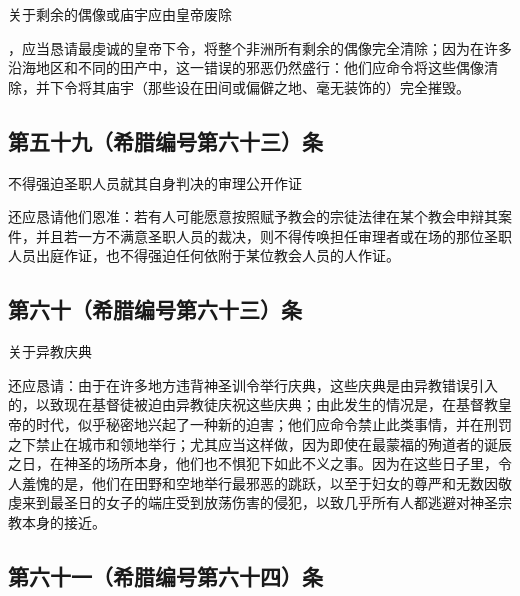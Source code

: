 关于剩余的偶像或庙宇应由皇帝废除\par

，应当恳请最虔诚的皇帝下令，将整个非洲所有剩余的偶像完全清除；因为在许多沿海地区和不同的田产中，这一错误的邪恶仍然盛行：他们应命令将这些偶像清除，并下令将其庙宇（那些设在田间或偏僻之地、毫无装饰的）完全摧毁。\par


\subsection{第五十九（希腊编号第六十三）条}

不得强迫圣职人员就其自身判决的审理公开作证\par

还应恳请他们恩准：若有人可能愿意按照赋予教会的宗徒法律在某个教会申辩其案件，并且若一方不满意圣职人员的裁决，则不得传唤担任审理者或在场的那位圣职人员出庭作证，也不得强迫任何依附于某位教会人员的人作证。\par


\subsection{第六十（希腊编号第六十三）条}

关于异教庆典\par

还应恳请：由于在许多地方违背神圣训令举行庆典，这些庆典是由异教错误引入的，以致现在基督徒被迫由异教徒庆祝这些庆典；由此发生的情况是，在基督教皇帝的时代，似乎秘密地兴起了一种新的迫害；他们应命令禁止此类事情，并在刑罚之下禁止在城市和领地举行；尤其应当这样做，因为即使在最蒙福的殉道者的诞辰之日，在神圣的场所本身，他们也不惧犯下如此不义之事。因为在这些日子里，令人羞愧的是，他们在田野和空地举行最邪恶的跳跃，以至于妇女的尊严和无数因敬虔来到最圣日的女子的端庄受到放荡伤害的侵犯，以致几乎所有人都逃避对神圣宗教本身的接近。\par


\subsection{第六十一（希腊编号第六十四）条}

